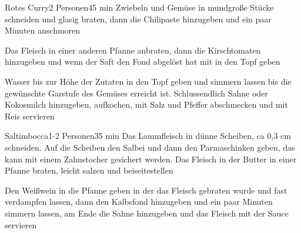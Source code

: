 
\begin{recipe}{Rotes Curry}{2 Personen}{45 min}
Zwiebeln und Gemüse in mundgroße Stücke schneiden und glasig braten, dann die Chilipaste hinzugeben und ein paar Minuten anschmoren

Das Fleisch in einer anderen Pfanne anbraten, dann die Kirschtomaten hinzugeben und wenn der Saft den Fond abgelöst hat mit in den Topf geben

Wasser bis zur Höhe der Zutaten in den Topf geben und simmern lassen bis die gewünschte Garstufe des Gemüses erreicht ist. Schlussendlich Sahne oder Kokosmilch hinzugeben, aufkochen, mit Salz und Pfeffer abschmecken und mit Reis servieren
\end{recipe}


\begin{recipe}{Saltimbocca}{1-2 Personen}{35 min}
Das Lammfleisch in dünne Scheiben, ca 0,3 cm schneiden. Auf die Scheiben den Salbei und dann den Parmaschinken geben, das kann mit einem Zahnstocher gesichert werden. Das Fleisch in der Butter in einer Pfanne braten, leicht salzen und beiseitestellen

Den Weißwein in die Pfanne geben in der das Fleisch gebraten wurde und fast verdampfen lassen, dann den Kalbsfond hinzugeben und ein paar Minuten simmern lassen, am Ende die Sahne hinzugeben und das Fleisch mit der Sauce servieren
\end{recipe}


